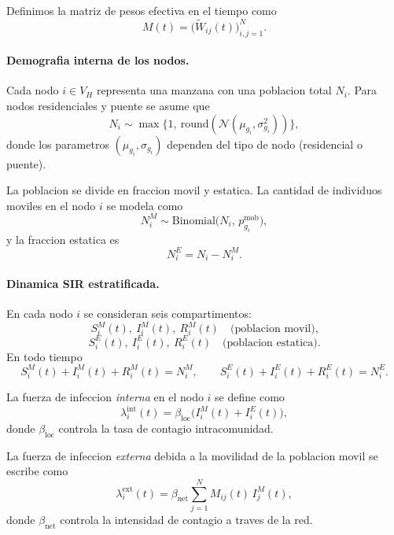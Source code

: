 Definimos la matriz de pesos efectiva en el tiempo como
\begin{equation}
  M(t) = \big( \tilde{W}_{ij}(t) \big)_{i,j=1}^N.
\end{equation}

\paragraph*{Demografia interna de los nodos.}

Cada nodo $i \in V_H$ representa una manzana con una poblacion total $N_i$. Para nodos residenciales y puente se asume que
\begin{equation}
  N_i \sim \max\{1,\ \text{round}(\mathcal{N}(\mu_{g_i}, \sigma_{g_i}^2))\},
\end{equation}
donde los parametros $(\mu_{g_i}, \sigma_{g_i})$ dependen del tipo de nodo (residencial o puente).

La poblacion se divide en fraccion movil y estatica. La cantidad de individuos moviles en el nodo $i$ se modela como
\begin{equation}
  N_i^{M} \sim \text{Binomial}\big(N_i,\, p^{\text{mob}}_{g_i}\big),
\end{equation}
y la fraccion estatica es
\begin{equation}
  N_i^{E} = N_i - N_i^{M}.
\end{equation}

\paragraph*{Dinamica SIR estratificada.}

En cada nodo $i$ se consideran seis compartimentos:
\[
S_i^M(t),\ I_i^M(t),\ R_i^M(t) \quad \text{(poblacion movil),}
\]
\[
S_i^E(t),\ I_i^E(t),\ R_i^E(t) \quad \text{(poblacion estatica).}
\]
En todo tiempo
\[
S_i^M(t) + I_i^M(t) + R_i^M(t) = N_i^M, \qquad
S_i^E(t) + I_i^E(t) + R_i^E(t) = N_i^E.
\]

La fuerza de infeccion \emph{interna} en el nodo $i$ se define como
\begin{equation}
  \lambda_i^{\text{int}}(t)
  = \beta_{\text{loc}} \big( I_i^M(t) + I_i^E(t) \big),
\end{equation}
donde $\beta_{\text{loc}}$ controla la tasa de contagio intracomunidad.

La fuerza de infeccion \emph{externa} debida a la movilidad de la poblacion movil se escribe como
\begin{equation}
  \lambda_i^{\text{ext}}(t)
  = \beta_{\text{net}} \sum_{j=1}^N M_{ij}(t)\, I_j^M(t),
\end{equation}
donde $\beta_{\text{net}}$ controla la intensidad de contagio a traves de la red.

